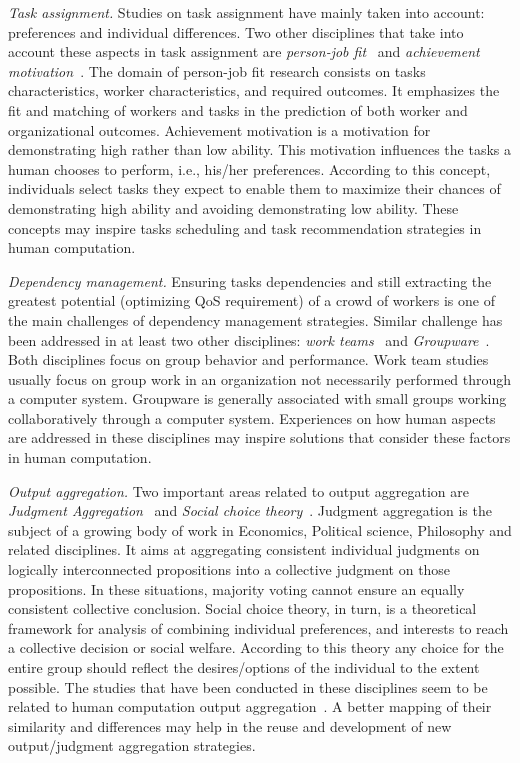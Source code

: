 \documentclass[11pt]{bmc_article_s50}
\begin{document}
\textit{Task assignment.} Studies on task assignment have mainly taken into account: preferences and individual differences. Two other disciplines that take into account these aspects in task assignment are \textit{person-job fit}~\cite{edwards1990person} and \textit{achievement motivation}~\cite{nicholls1984achievement}. The domain of person-job fit research consists on tasks characteristics, worker characteristics, and required outcomes. It emphasizes the fit and matching of workers and tasks in the prediction of both worker and organizational outcomes. Achievement motivation is a motivation for demonstrating high rather than low ability. This motivation influences the tasks a human chooses to perform, i.e., his/her preferences. According to this concept, individuals select tasks they expect to enable them to maximize their chances of demonstrating high ability and avoiding demonstrating low ability. These concepts may inspire tasks scheduling and task recommendation strategies in human computation.

\textit{Dependency management.} Ensuring tasks dependencies and still extracting the greatest potential (optimizing QoS requirement) of a crowd of workers is one of the main challenges of dependency management strategies. Similar challenge has been addressed in at least two other disciplines: \textit{work teams}~\cite{Hackman:workteams:1987} and \textit{Groupware}~\cite{Karsenty:1993}. Both disciplines focus on group behavior and performance. Work team studies usually focus on group work in an organization not necessarily performed through a computer system. Groupware is generally associated with small groups working collaboratively through a computer system. Experiences on how human aspects are addressed in these disciplines may inspire solutions that consider these factors in human computation.{\pagebreak} 

\textit{Output aggregation.} Two important areas related to output aggregation are \textit{Judgment Aggregation}~\cite{dietrich:2007} and \textit{Social choice theory}~\cite{Taylor:Book:2008}. Judgment aggregation is the subject of a growing body of work in Economics, Political science, Philosophy and related disciplines. It aims at aggregating consistent individual judgments on logically interconnected propositions into a collective judgment on those propositions. In these situations, majority voting cannot ensure an equally consistent collective conclusion. Social choice theory, in turn, is a theoretical framework for analysis of combining individual preferences, and interests to reach a collective decision or social welfare. According to this theory any choice for the entire group should reflect the desires/options of the individual to the extent possible. The studies that have been conducted in these disciplines seem to be related to human computation output aggregation~\cite{Andrew:2013,Pettit:PhilosophicalIssues:2011}. A better mapping of their similarity and differences may help in the reuse and development of new output/judgment aggregation strategies.
\end{document}
